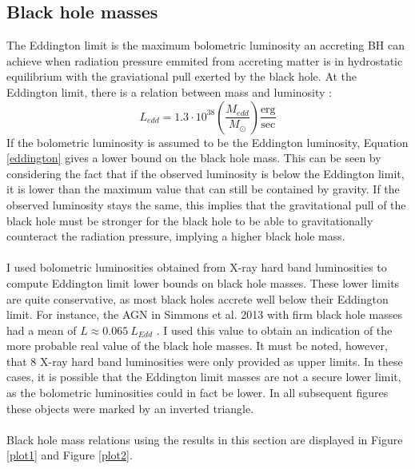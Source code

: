 \documentclass[11pt,twocolumn]{article}
\begin{document}
\subsection{\normalsize  Black hole masses}\label{bhmass}
The Eddington limit is the maximum bolometric luminosity an accreting BH can achieve when radiation pressure emmited from accreting matter is in hydrostatic equilibrium with the graviational pull exerted by the black hole. At the Eddington limit, there is a relation between mass and luminosity \cite{2013heai.book.....C}: 
\begin{equation}
L_{edd} = 1.3 \cdot 10^{38} \left( \frac{M_{edd}}{M_{\odot}} \right) \mathrm{ \frac{erg}{sec}}
\label{eddington}
\end{equation}
If the bolometric luminosity is assumed to be the Eddington luminosity, Equation \ref{eddington} gives a lower bound on the black hole mass. This can be seen by considering the fact that if the observed luminosity is below the Eddington limit, it is lower than the maximum value that can still be contained by gravity. If the observed luminosity stays the same, this implies that the gravitational pull of the black hole must be stronger for the black hole to be able to gravitationally counteract the radiation pressure, implying a higher black hole mass.
\paragraph{} I used bolometric luminosities obtained from X-ray hard band luminosities to compute Eddington limit lower bounds on black hole masses. These lower limits are quite conservative, as most black holes accrete well below their Eddington limit. For instance, the AGN in Simmons et al.  2013 with firm black hole masses had a mean of $L \approx 0.065 \: L_ {Edd}$\cite{Simmons01032013} . I used this value to obtain an indication of the more probable real value of the black hole masses. It must be noted, however, that 8 X-ray hard band luminosities were only provided as upper limits. In these cases, it is possible that the Eddington limit masses are not a secure lower limit, as the bolometric luminosities could in fact be lower. In all subsequent figures these objects were marked by an inverted triangle. 
\paragraph{} Black hole mass relations using the results in this section are displayed in Figure \ref{plot1} and Figure \ref{plot2}. 
\end{document}
